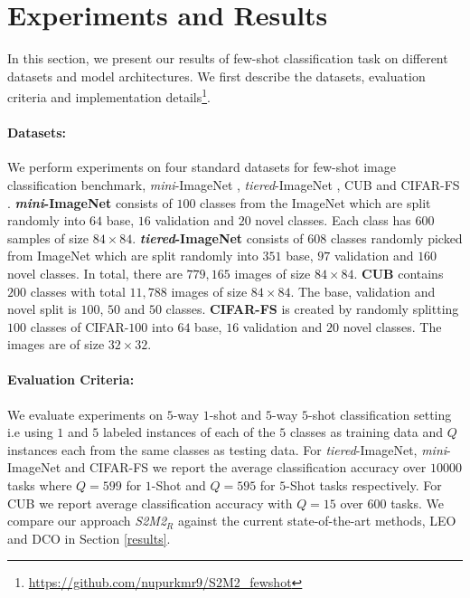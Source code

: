 \documentclass[10pt,twocolumn,letterpaper]{article}
\begin{document}
\section{Experiments and Results}
\label{experiments}
In this section, we present our results of few-shot classification task on different datasets and model architectures. We first describe the datasets, evaluation criteria and implementation details\footnote {\href{https://github.com/nupurkmr9/S2M2\_fewshot}{https://github.com/nupurkmr9/S2M2\_fewshot}}.
\vspace{-8pt}
\paragraph{Datasets:} 
We perform experiments on four standard datasets for few-shot image classification benchmark, \textit{mini}-ImageNet \cite{vinyals2016matching}, \textit{tiered}-ImageNet \cite{tieredImagenet}, CUB \cite{WahCUB_200_2011} and CIFAR-FS \cite{cifar-fs2018Bertinetto}. \textbf{\textit{mini}-ImageNet} consists of $100$ classes from the ImageNet \cite{imagenet2014Russakovsky} which are split randomly into $64$ base, $16$ validation and $20$ novel classes. Each class has $600$ samples of size $84\times84$. \textbf{{\textit{tiered}-ImageNet}}  consists of $608$ classes randomly picked from ImageNet \cite{imagenet2014Russakovsky} which are split randomly into $351$ base, $97$ validation and $160$ novel classes. In total, there are $779,165$ images of size $84\times84$. \textbf{CUB} contains $200$ classes with total $11,788$ images of size $84\times84$. The base, validation and novel split is $100$, $50$ and $50$ classes. \textbf{CIFAR-FS} is created by randomly splitting $100$ classes of CIFAR-$100$ \cite{cifar100dataset} into $64$ base, $16$ validation and $20$ novel classes. The images are of size $32\times32$.
\vspace{-8pt}
\paragraph{Evaluation Criteria:} 
We evaluate experiments on $5$-way $1$-shot and $5$-way $5$-shot \cite{vinyals2016matching} classification setting i.e using $1$ and $5$ labeled instances of each of the $5$ classes as training data and $Q$ instances each from the same classes as testing data. For {\textit{tiered}-ImageNet}, \textit{mini}-ImageNet and CIFAR-FS we report the average classification accuracy over $10000$ tasks where $Q=599$ for $1$-Shot and $Q=595$ for $5$-Shot tasks respectively. For CUB we report average classification accuracy with $Q=15$ over $600$ tasks. We compare our approach \textit{S2M2$_R$} against the current state-of-the-art methods, LEO \cite{leo2019} and DCO \cite{dco2019} in Section \ref{results}.
\end{document}
